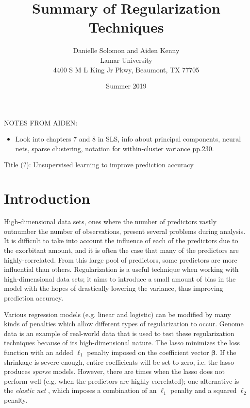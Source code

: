 \documentclass[10pt]{article}
\begin{document}

\title{Summary of Regularization Techniques}
\author{Danielle Solomon and Aiden Kenny\\
Lamar University\\
4400 S M L King Jr Pkwy, Beaumont, TX 77705}
\date{Summer 2019}
\maketitle


NOTES FROM AIDEN:
\begin{itemize}
    \item Look into chapters 7 and 8 in SLS, info about principal components, neural nets, sparse clustering, notation for within-cluster variance pp.230.
\end{itemize}

Title (?): Unsupervised learning to improve prediction accuracy

\section{Introduction}
   
High-dimensional data sets, ones where the number of predictors vastly outnumber the number of observations, present several problems during analysis. It is difficult to take into account the influence of each of the predictors due to the exorbitant amount, and it is often the case that many of the predictors are highly-correlated. From this large pool of predictors, some predictors are more influential than others. Regularization is a useful technique when working with high-dimensional data sets; it aims to introduce a small amount of bias in the model with the hopes of drastically lowering the variance, thus improving prediction accuracy.

Various regression models (e.g. linear and logistic) can be modified by many kinds of penalties which allow different types of regularization to occur. Genome data is an example of real-world data that is used to test these regularization techniques because of its high-dimensional nature. The lasso \cite{tibshirani1996regression} minimizes the loss function with an added $\ell_1$ penalty imposed on the coefficient vector $\bm{\beta}$. If the shrinkage is severe enough, entire coefficients will be set to zero, i.e. the lasso produces \textit{sparse} models. However, there are times when the lasso does not perform well (e.g. when the predictors are highly-correlated); one alternative is the \textit{elastic net} \cite{zou2005regularization}, which imposes a combination of an $\ell_1$ penalty and a squared $\ell_2$ penalty. 
\end{document}

